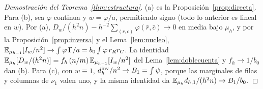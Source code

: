\begin{proof}[Demostración del Teorema~\ref{thm:estructura}]
(a) es la Proposición~\ref{prop:directa}. Para (b), sea $\varphi$ continua y $w=\varphi/a$,
permitiendo signo (todo lo anterior es lineal en $w$). Por (a),
$D_w/(h^2n)-h^{-2}\sum_{(r,c)}\varphi(\bar r,\bar c)\to0$ en media bajo $\mu_h$, y por la
Proposición~\ref{prop:inversa} y el Lema~\ref{lem:nucleo},
$\mathbb{E}_{\mu_{h-1}}[I_w/n^2]\to\int\varphi\,\Gamma/a=b_0\int\varphi\,r_Rr_C$. La identidad
$\mathbb{E}_{\mu_h}[D_w/(h^2n)]=f_h\,(n/m)\,\mathbb{E}_{\mu_{h-1}}[I_w/n^2]$ del Lema~\ref{lem:doblecuenta} y
$f_h\to1/b_0$ dan (b). Para (c), con $w\equiv1$,
$d_h^{\mathrm{inv}}/n^2\to B_1=\int\psi$, porque las marginales de filas y columnas de $\nu_1$ valen uno, y
la misma identidad da $\mathbb{E}_{\mu_h}d_{h,1}/(h^2n)\to B_1/b_0$.
\end{proof}
